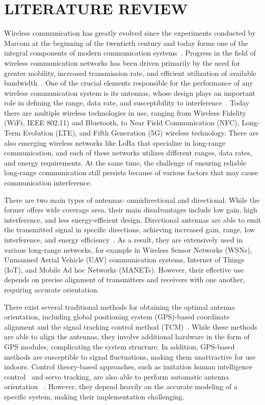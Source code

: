 \newpage
\section{LITERATURE REVIEW}

Wireless communication has greatly evolved since the experiments conducted by Marconi at the beginning of the twentieth century and today forms one of the integral components of modern communication systems~\cite{ref3}. Progress in the field of wireless communication networks has been driven primarily by the need for greater mobility, increased transmission rate, and efficient utilization of available bandwidth~\cite{ref4}. One of the crucial elements responsible for the performance of any wireless communication system is its antennas, whose design plays an important role in defining the range, data rate, and susceptibility to interference~\cite{ref5}. Today there are multiple wireless technologies in use, ranging from Wireless Fidelity (WiFi, IEEE 802.11) and Bluetooth, to Near Field Communication (NFC), Long-Term Evolution (LTE), and Fifth Generation (5G) wireless technology. There are also emerging wireless networks like LoRa that specialize in long-range communication, and each of these networks utilizes different ranges, data rates, and energy requirements. At the same time, the challenge of ensuring reliable long-range communication still persists because of various factors that may cause communication interference.

There are two main types of antennas: omnidirectional and directional. While the former offers wide coverage area, their main disadvantages include low gain, high interference, and less energy-efficient design. Directional antennas are able to emit the transmitted signal in specific directions, achieving increased gain, range, low interference, and energy efficiency~\cite{ref6}. As a result, they are extensively used in various long-range networks, for example in Wireless Sensor Networks (WSNs), Unmanned Aerial Vehicle (UAV) communication systems, Internet of Things (IoT), and Mobile Ad hoc Networks (MANETs). However, their effective use depends on precise alignment of transmitters and receivers with one another, requiring accurate orientation.

There exist several traditional methods for obtaining the optimal antenna orientation, including global positioning system (GPS)-based coordinate alignment and the signal tracking control method (TCM)~\cite{ref7,ref8}. While these methods are able to align the antennas, they involve additional hardware in the form of GPS modules, complicating the system structure. In addition, GPS-based methods are susceptible to signal fluctuations, making them unattractive for use indoors. Control theory-based approaches, such as imitation human intelligence control~\cite{ref9} and servo tracking, are also able to perform automatic antenna orientation~\cite{ref10} . However, they depend heavily on the accurate modeling of a specific system, making their implementation challenging.

